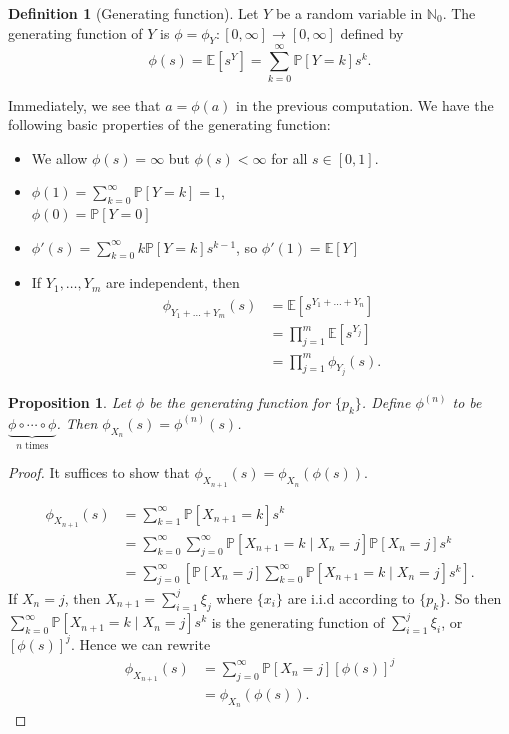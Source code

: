 \documentclass{tufte-handout}
\newcommand*\N{\mathbb{N}}
\newcommand*\E{\mathbb{E}}
\renewcommand*\P{\mathbb{P}}
\newtheorem{prop}[thm]{Proposition}
\theoremstyle{definition}
\newtheorem{defn}[thm]{Definition}
\begin{document}
\begin{defn}[Generating function]
	Let $Y$ be a random variable in $\N_0$. The generating function of $Y$ is $\phi = \phi_Y: [0,\infty] \to [0,\infty]$ defined by \[
		\phi(s) = \E\left[s^Y\right] = \sum\limits_{k=0}^{\infty} \P\left[Y=k\right] s^{k}
	.\] 
\end{defn}

Immediately, we see that $a = \phi(a)$ in the previous computation. We have the following basic properties of the generating function:
\begin{itemize}
	\item We allow $\phi(s) = \infty$ but $\phi(s) < \infty$ for all $s \in [0,1]$. 
	\item $\phi(1) = \sum\limits_{k=0}^{\infty} \P\left[Y= k \right] = 1$, \\ $\phi(0) = \P\left[Y=0\right] $
	\item $\phi'(s) = \sum\limits_{k=0}^{\infty} k \P\left[Y = k\right] s^{k-1}$, so $\phi'(1) = \E\left[Y\right] $
	\item If $Y_1,\ldots,Y_m$ are independent, then \begin{align*}
			\phi_{Y_1 + \ldots+Y_m}(s) &= \E\left[s^{Y_1 + \ldots + Y_n}\right] \\
			&= \prod_{j=1}^{m} \E\left[s^{Y_j}\right]   \\
			&= \prod_{j=1}^{m} \phi_{Y_j}(s) 
	.\end{align*}
\end{itemize}
\begin{prop}
Let $\phi$ be the generating function for $\{p_k\}$. Define $\phi^{(n)}$ to be $\underbrace{\phi \circ \cdots \circ \phi}_{n \text{ times}}$. Then $\phi_{X_n}(s) = \phi^{(n)}(s)$.
\end{prop}
\begin{proof}
	It suffices to show that $\phi_{X_{n+1}}(s) = \phi_{X_n} \left( \phi(s) \right)$.

	\begin{align*}
		\phi_{X_{n+1}}(s) &= \sum\limits_{k=1}^{\infty} \P\left[X_{n+1} = k\right] s^{k} \\
		&= \sum\limits_{k=0}^{\infty} \sum\limits_{j=0}^{\infty} \P\left[X_{n+1} = k \mid X_n = j\right] \P\left[X_n = j\right] s^{k} \\
		&= \sum\limits_{j=0}^{\infty} \left[\P\left[X_n = j\right] \sum\limits_{k=0}^{\infty} \P\left[X_{n+1} = k \mid X_n = j\right] s^{k}\right]
	.\end{align*}
	If $X_n = j$, then $X_{n+1} = \sum\limits_{i=1}^{j} \xi_j$ where $\{x_i\}$ are i.i.d according to $\{p_k\}$. So then $\sum\limits_{k=0}^{\infty} \P\left[X_{n+1} = k \mid X_n = j\right]s^{k}$ is the generating function of $\sum\limits_{i=1}^{j} \xi_i$, or $\left[ \phi(s) \right]^{j}$. Hence we can rewrite
	\begin{align*}
		\phi_{X_{n+1}}(s) &= \sum\limits_{j=0}^{\infty} \P\left[X_n = j \right] \left[ \phi(s) \right]^{j} \\
						  &= \phi_{X_n}(\phi(s))
	.\end{align*}
\end{proof}
\end{document}
